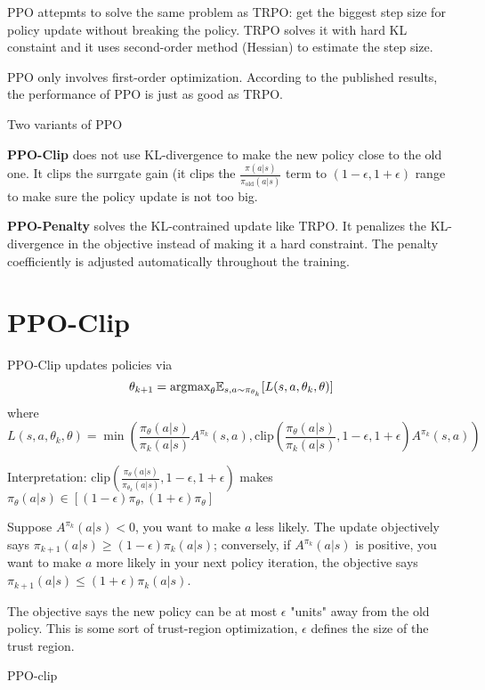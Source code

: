 \documentclass{article}
\begin{document}
PPO attepmts to solve the same problem as TRPO: get the biggest step
size for policy update without breaking the policy. TRPO solves it 
with hard KL constaint and it uses second-order method (Hessian) to
estimate the step size. 

PPO only involves first-order optimization. According to the published
results, the performance of PPO is just as good as TRPO. 

Two variants of PPO

\textbf{PPO-Clip} does not use KL-divergence to make the new policy 
close to the old one. It clips the surrgate gain (it clips the 
$\frac{\pi(a|s)}{\pi_{\text{old}}(a|s)}$ term to $(1 - \epsilon, 
1 + \epsilon)$ range to make sure the policy update is not too big. 

\textbf{PPO-Penalty} solves the KL-contrained update like TRPO. It 
penalizes the KL-divergence in the objective instead of making it a 
hard constraint. The penalty coefficiently is adjusted automatically 
throughout the training. 


\section{PPO-Clip}
PPO-Clip updates policies via
\[
\theta_{k+1} = \text{argmax}_{\theta}\mathbb{E}_{s, a\sim \pi_{\theta_k}}
[L(s, a, \theta_k, \theta)]
\]
where 
\[
L(s, a, \theta_k, \theta) = \min(
\frac{\pi_{\theta}(a|s)}{\pi_k(a|s)}A^{\pi_k}(s, a), \text{clip}(
\frac{\pi_{\theta}(a|s)}{\pi_k(a|s)}, 1-\epsilon, 1 + \epsilon)
A^{\pi_k}(s, a))
\]

Interpretation:
$\text{clip}(\frac{\pi_{\theta}(a|s)}{\pi_{\theta_k}(a|s)}, 
1-\epsilon, 1 + \epsilon)$ makes 
$\pi_{\theta}(a|s) \in [(1-\epsilon)\pi_{\theta}, (1+\epsilon)
\pi_{\theta}]$

Suppose $A^{\pi_k}(a|s) <0$, you want to make $a$ less likely. The 
update objectively says $\pi_{k+1}(a|s) \geq (1-\epsilon)\pi_k(a|s)$;
conversely, if $A^{\pi_k}(a|s)$ is positive, you want to make $a$
more likely in your next policy iteration, the objective says
$\pi_{k+1}(a|s) \leq (1 + \epsilon)\pi_k(a|s)$.

The objective says the new policy can be at most $\epsilon$ "units" 
away from the old policy. This is some sort of trust-region 
optimization, $\epsilon$ defines the size of the trust region.  

\begin{algorithm}[H]
\caption{PPO-clip}
\label{alg1}
\end{algorithm}
\end{document}
